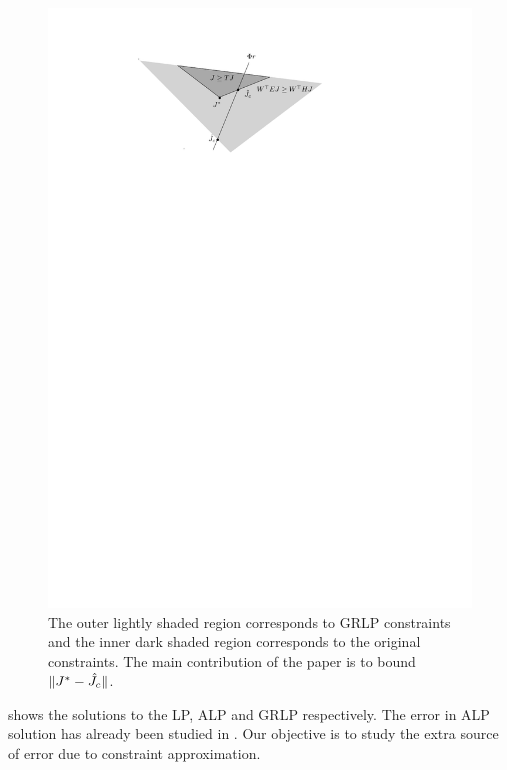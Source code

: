 \FloatBarrier
%
\begin{figure}
\includegraphics[scale=0.7]{cartoon_grlp.pdf}
\caption{
The outer lightly shaded region corresponds to GRLP constraints and the inner dark shaded region corresponds to the original constraints. The main contribution of the paper is to bound $\|J^*-\hat{J}_c\|$.}
\label{cartoon}
\end{figure}
 shows the solutions to the LP, ALP and GRLP respectively. The error in ALP solution has already been studied in \cite{ALP}. Our objective is to study the extra source of error due to constraint approximation.
\fi

